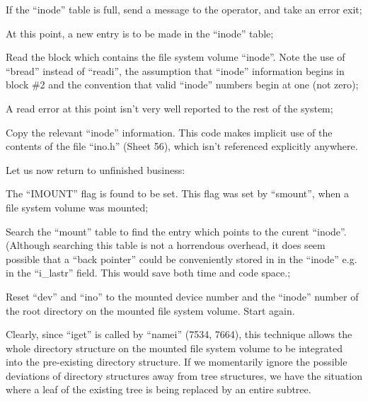 \item[7309:] If the  ``inode''  table  is  full,
      send  a  message to the operator,
      and take an error exit;

\item[7314:] At this point, a new entry is  to
      be made in the ``inode'' table;

\item[7319:] Read the block which contains the
      file  system volume ``inode''. Note
      the use  of  ``bread''  instead  of
      ``readi'',   the   assumption  that
      ``inode''  information  begins   in
      block \#2  and the convention that
      valid ``inode''  numbers  begin  at
      one (not zero);

\item[7326:] A read error at this point isn't
      very well reported to the rest of       
      the system; 

\item[7328:] Copy the relevant ``inode'' 
information.  This code makes implicit
      use of the contents of  the  file
      ``ino.h''  (Sheet  56), which isn't
      referenced explicitly anywhere.
\ed

\noindent Let us now return to  unfinished  business:

\bd
\item[7292:] The ``IMOUNT'' flag is found to  be
      set.   This   flag   was  set  by
``smount'',  when  a  file   system
volume was mounted;

\item[7293:] Search the ``mount'' table to  find
      the  entry  which  points  to the
      curent    ``inode''.     (Although
      searching  this  table  is  not a
      horrendous overhead, it does seem
      possible  that  a  ``back pointer''
      could be conveniently  stored  in
      in   the   ``inode''  e.g.  in  the
      ``i\_lastr'' field. This would  save
      both time and code space.;

\item[7396:] Reset  ``dev''  and  ``ino''  to  the
      mounted  device  number  and  the
      ``inode'' number of the root directory  on  the mounted file system
      volume.  Start again.
\ed


Clearly,  since  ``iget''  is  called  by
``namei''  (7534,  7664),  this technique
allows the whole directory structure on
the  mounted  file  system volume to be
integrated into the pre-existing directory   structure.   If  we  momentarily
ignore  the  possible   deviations   of
directory  structures  away  from  tree
structures, we have the situation where
a  leaf  of  the existing tree is being
replaced by an entire subtree.


